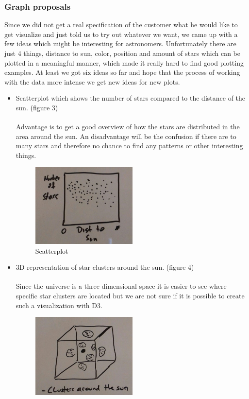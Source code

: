 \documentclass{article}
\begin{document}
\subsubsection{Graph proposals}
Since we did not get a real specification of the customer what he would like to get visualize and just told us to try out whatever we want, we came up with a few ideas which might be interesting for astronomers. Unfortunately there are just 4 things, distance to sun, color, position and amount of stars which can be plotted in a meaningful manner, which made it really hard to find good plotting examples. At least we got six ideas so far and hope that the process of working with the data more intense we get new ideas for new plots.
\begin{itemize}
\item Scatterplot which shows the number of stars compared to the distance of the sun. (figure 3)\\
\\
Advantage is to get a good overview of how the stars are distributed in the area around the sun.
An disadvantage will be the confusion if there are to many stars and therefore no chance to find any patterns or other interesting things.
\begin{figure}[!h]
\centering
\includegraphics[width=0.5\textwidth]{NumbStarsDistSun.jpg}
	\caption{Scatterplot}
	\label{fig3}
\end{figure}
\item 3D representation of star clusters around the sun. (figure 4)\\
\\
Since the universe is a three dimensional space it is easier to see where specific star clusters are located but we are not sure if it is possible to create such a visualization with D3.
\begin{figure}[!h]
\centering
\includegraphics[width=0.5\textwidth]{ClustersSun3d.jpg}

\end{figure}
\end{itemize}
\end{document}

